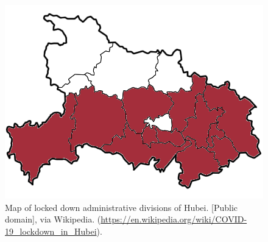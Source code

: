 \documentclass[sigplan,screen]{acmart}
\begin{document}
\begin{figure}[htb]
	\centering
	\includegraphics[width=\linewidth]{hubei.png}
	\caption{Map of locked down administrative divisions of Hubei. [Public domain], via Wikipedia. (\url{https://en.wikipedia.org/wiki/COVID-19_lockdown_in_Hubei}).}
\end{figure}
\end{document}

